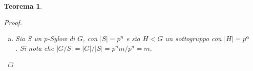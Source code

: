 \documentclass[12pt]{scrartcl}
\theoremstyle{style}
\newtheorem{teorema}{Teorema}[section]
\numberwithin{equation}{subsection}
\begin{document}
\begin{teorema}
\begin{proof}
\begin{enumerate}[(a).]
				Ora si considera l'azione di $G$ su $\mathcal{M} $ data da $\phi : G \to S(\mathcal{M} )$, con $\phi (g) (M)= \phi _g(M)=gM$; per il teorema delle classi:
				\[
				|\mathcal{M} | = \sum_{M_i \in R}^{} \lvert \operatorname{Orb} (M_i) \rvert = \sum_{M_i \in R}^{} \frac{\lvert G \rvert }{\lvert \operatorname{Stab} (M_i) \rvert }
				\] 
				con $R$ insieme dei rappresentanti delle orbite.
				Il fatto che $p^{n-\alpha }  \mid  \mid \lvert \mathcal{M}  \rvert $\footnote{La notazione $ \mid  \mid $ si usa per indicare divisione esatta, cio\`e nessun esponente maggiore \`e divisore.} implica che $\exists i$ tale per cui
				\[
				p^{n- \alpha  + 1}   \nmid \lvert \operatorname{Orb} (M_i) \rvert = \frac{\lvert G \rvert }{\lvert \operatorname{Stab} (M_i) \rvert }= \frac{p^n m }{\lvert \operatorname{Stab} (M_i) \rvert }
				\] 
				Ne segue che $p^\alpha  \mid \lvert \operatorname{Stab}(M_i)  \rvert$, perch\'e se ogni potenza di $p$ con esponente maggiore di $n-\alpha $ non deve dividere l'ordine dell'orbita, allora, al denominatore, deve essere presente una potenza di $p$ con esponente $\ge \alpha $. 

				Quindi, si ha $\lvert \operatorname{Stab}(M_i)  \rvert \ge p^\alpha $ e si dimostra che $\lvert \operatorname{Stab} (M_i) \rvert = p^\alpha $.
				Per farlo, si considera la mappa $\operatorname{Stab} (M_i) \longrightarrow M_i$ tale che $\operatorname{Stab}( M_i)\ni y\longmapsto yx$, per $x \in  M_i$, \`e iniettiva perch\'e $yx = y_1 x \iff y=  y_1$, quindi $\operatorname{Stab} (M_i) \le \lvert M_i\rvert =p^\alpha $, da cui $\lvert \operatorname{Stab} (M_i) \rvert = p^\alpha $. 
				Essendo $\operatorname{Stab} (M_i) < G$, significa che in $G$ esiste un sottogruppo di ordine $p^\alpha $.
			\item Sia $S$ un $p$-Sylow di $G$, con $\lvert S \rvert = p^n$ e sia $H < G$ un sottogruppo con $\lvert H \rvert =p^\alpha $.
				Si nota che $\lvert G / S \rvert = \lvert  G \rvert / \lvert S \rvert = p^n m/ p^n = m$.


\end{enumerate}
\end{proof}
\end{teorema}
\end{document}
